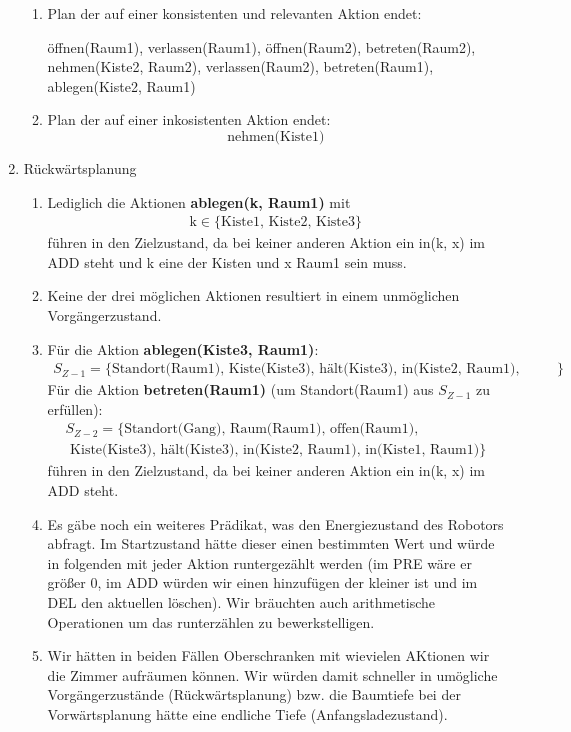 \documentclass[a4paper,10pt]{article}
\begin{document}
\begin{enumerate}[~~a.)]
\begin{enumerate}[~~i)]
        \item Plan der auf einer konsistenten und relevanten Aktion endet:
        \begin{center}
         öffnen(Raum1), verlassen(Raum1), öffnen(Raum2), betreten(Raum2), \\
         nehmen(Kiste2, Raum2), verlassen(Raum2), betreten(Raum1), ablegen(Kiste2, Raum1)
        \end{center}
        \item Plan der auf einer inkosistenten Aktion endet:
        $$\textrm{nehmen(Kiste1)}$$
    \end{enumerate}
    \item Rückwärtsplanung
    \begin{enumerate}[~~i)]
    	\item Lediglich die Aktionen \textbf{ablegen(k, Raum1)} mit
    	\begin{align*}
    	\textrm{k} \in \{\textrm{Kiste1, Kiste2, Kiste3}\}
    	\end{align*}
    	führen in den Zielzustand, da bei keiner anderen Aktion ein in(k, 			x) im ADD steht und k eine der Kisten und x Raum1 sein muss. 
    	\item Keine der drei möglichen Aktionen resultiert in einem 				unmöglichen Vorgängerzustand.
    	\item Für die Aktion \textbf{ablegen(Kiste3, Raum1)}:
    	\begin{align*}
    	S_{Z-1} = \{\textrm{Standort(Raum1), Kiste(Kiste3), hält(Kiste3), 			in(Kiste2, Raum1), in(Kiste1, Raum1)}\}
    	\end{align*}
    	Für die Aktion \textbf{betreten(Raum1)} (um Standort(Raum1) aus 			$S_{Z-1}$ zu erfüllen):
    	\begin{align*}
    	S_{Z-2} = \{\textrm{Standort(Gang), Raum(Raum1), offen(Raum1),}\\ 			\textrm{ Kiste(Kiste3), hält(Kiste3), in(Kiste2, Raum1), 					in(Kiste1, Raum1)}\}
    	\end{align*}
    	führen in den Zielzustand, da bei keiner anderen Aktion ein in(k, x) im ADD steht. 
        \item Es gäbe noch ein weiteres Prädikat, was den Energiezustand des Robotors abfragt. Im Startzustand hätte dieser einen bestimmten Wert und würde in folgenden mit jeder Aktion runtergezählt werden (im PRE wäre er größer 0, im ADD würden wir einen hinzufügen der kleiner ist und im DEL den aktuellen löschen). Wir bräuchten auch arithmetische Operationen um das runterzählen zu bewerkstelligen.
        \item Wir hätten in beiden Fällen Oberschranken mit wievielen AKtionen wir die Zimmer aufräumen können. Wir würden damit schneller in umögliche Vorgängerzustände (Rückwärtsplanung) bzw. die Baumtiefe bei der Vorwärtsplanung hätte eine endliche Tiefe (Anfangsladezustand).
    \end{enumerate}
\end{enumerate}
\end{document}
